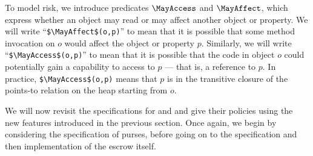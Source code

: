 
To model risk, we introduce predicates $\MayAccess$ and $\MayAffect$, which
express whether an object may read or may affect another object or
property. We will write
%
``\lstinline+$\MayAffect$(o,p)+''
%
to mean that it is possible that some method invocation on $o$ would
affect the object or property $p$. Similarly, we will write
%
``\lstinline+$\MayAccess$(o,p)+''
%
to mean that it is possible that the code in object $o$ could potentially gain
a capability to access to $p$ --- that is, a reference to $p$.  In
practice, \lstinline+$\MayAccess$(o,p)+ means that $p$ is in the
transitive closure of the points-to relation on the heap starting from
$o$.

%

%



 

 
We will now revisit the specifications for  and
 and give their policies using the new features introduced
in the previous section.
Once again, we begin by considering the specification of purses,
before going on to the specification and then implementation of the
escrow itself.  

